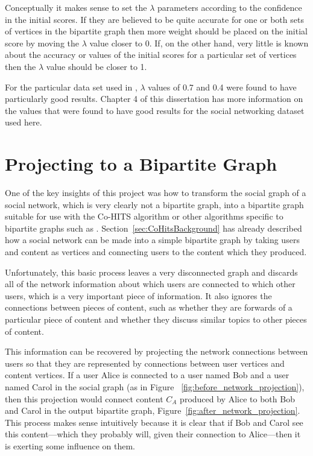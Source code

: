 Conceptually it makes sense to set the $\lambda$ parameters according to the confidence in the initial scores. If they are believed to be quite accurate for one or both sets of vertices in the bipartite graph then more weight should be placed on the initial score by moving the $\lambda$ value closer to 0. If, on the other hand, very little is known about the accuracy or values of the initial scores for a particular set of vertices then the $\lambda$ value should be closer to 1.

For the particular data set used in \cite{Deng2009}, $\lambda$ values of 0.7 and 0.4 were found to have particularly good results. Chapter 4 of this dissertation has more information on the values that were found to have good results for the social networking dataset used here.

\section{Projecting to a Bipartite Graph}
\label{sec:ProjectingToBipartite}

One of the key insights of this project was how to transform the social graph of a social network, which is very clearly not a bipartite graph, into a bipartite graph suitable for use with the Co-HITS algorithm or other algorithms specific to bipartite graphs such as \cite{Kunegis2010}. Section~\ref{sec:CoHitsBackground} has already described how a social network can be made into a simple bipartite graph by taking users and content as vertices and connecting users to the content which they produced.

Unfortunately, this basic process leaves a very disconnected graph and discards all of the network information about which users are connected to which other users, which is a very important piece of information. It also ignores the connections between pieces of content, such as whether they are forwards of a particular piece of content and whether they discuss similar topics to other pieces of content.

This information can be recovered by projecting the network connections between users so that they are represented by connections between user vertices and content vertices. If a user Alice is connected to a user named Bob and a user named Carol in the social graph (as in Figure ~\ref{fig:before_network_projection}), then this projection would connect content $C_{A}$ produced by Alice to both Bob and Carol in the output bipartite graph, Figure~\ref{fig:after_network_projection}. This process makes sense intuitively because it is clear that if Bob and Carol see this content---which they probably will, given their connection to Alice---then it is exerting some influence on them.

